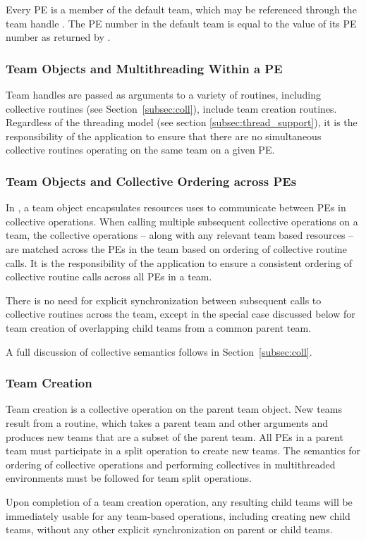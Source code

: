 Every \ac{PE} is a member of the default team, which may be referenced
through the team handle .
The \ac{PE} number in the default team is equal to the
value of its \ac{PE} number as returned by .

\subsubsection*{Team Objects and Multithreading Within a \ac{PE}}

Team handles are passed as arguments to a variety of \openshmem routines,
including collective routines (see Section~\ref{subsec:coll}), include team
creation routines.  Regardless of the \openshmem threading model
(see section \ref{subsec:thread_support}), it is the responsibility
of the application to ensure that there are no simultaneous collective
routines operating on the same \openshmem team on a given \ac{PE}.

\subsubsection*{Team Objects and Collective Ordering across \acp{PE}}

In \openshmem, a team object encapsulates resources uses to communicate
between \acp{PE} in collective operations. When calling multiple subsequent
collective operations on a team, the collective operations -- along with any
relevant team based resources -- are matched across the \acp{PE} in the team
based on ordering of collective routine calls. It is the responsibility
of the application to ensure a consistent ordering of collective routine calls
across all \acp{PE} in a team.

There is no need for explicit synchronization between subsequent calls
to collective routines across the team, except in the special case discussed
below for team creation of overlapping child teams from a common parent team.

A full discussion of collective semantics follows in Section~\ref{subsec:coll}.

\subsubsection*{Team Creation}

Team creation is a collective operation on the parent team object. New teams
result from a  routine, which takes a parent team
and other arguments and produces new teams that are a subset of the parent
team. All \acp{PE} in a parent team must participate in a split operation
to create new teams. The semantics for ordering of collective operations
and performing collectives in multithreaded environments must be followed
for team split operations. 

Upon completion of a team creation operation, any resulting child teams will be
immediately usable for any team-based operations, including creating new child teams,
without any other explicit synchronization on parent or child teams.




